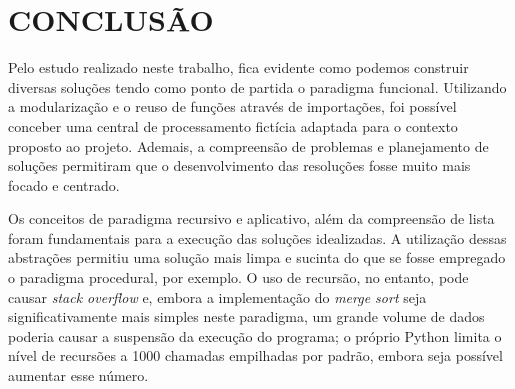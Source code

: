 \chapter*{CONCLUSÃO}\label{cap-conclusao}


Pelo estudo realizado neste trabalho, fica evidente como podemos construir diversas soluções tendo como ponto de partida o paradigma funcional. Utilizando a modularização e o reuso de funções através de importações, foi possível conceber uma central de processamento fictícia adaptada para o contexto proposto ao projeto. Ademais, a compreensão de problemas e planejamento de soluções permitiram que o desenvolvimento das resoluções fosse muito mais focado e centrado. 

Os conceitos de paradigma recursivo e aplicativo, além da compreensão de lista foram fundamentais para a execução das soluções idealizadas. A utilização dessas abstrações permitiu uma solução mais limpa e sucinta do que se fosse empregado o paradigma procedural, por exemplo. O uso de recursão, no entanto, pode causar \textit{stack overflow} e, embora a implementação do \textit{merge sort} seja significativamente mais simples neste paradigma, um grande volume de dados poderia causar a suspensão da execução do programa; o próprio Python limita o nível de recursões a 1000 chamadas empilhadas por padrão, embora seja possível aumentar esse número.